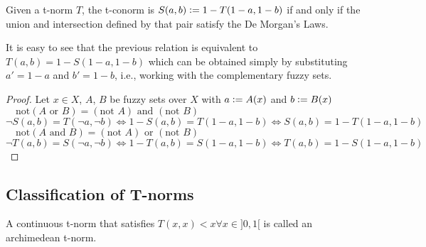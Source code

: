\begin{proposition}
  Given a t-norm $T$, the t-conorm is $S(a,b)\mathrel{\mathop:}= 1 - T(1-a, 1-b)$ if and only if the union and intersection defined by that pair satisfy the De Morgan's Laws.
\end{proposition}
\begin{remark}
  It is easy to see that the previous relation is equivalent to $T(a,b) = 1-S(1-a, 1-b)$ which can be obtained simply by substituting $a'=1-a$ and $b'=1-b$, i.e., working with the complementary fuzzy sets.
\end{remark}

\begin{proof}
  Let $x\in X$, $A$, $B$ be fuzzy sets over $X$ with $a \mathrel{\mathop:}= A(x)$ and $b \mathrel{\mathop:}= B(x)$\\

  $\quad \boxed{\text{not}(A \text{ or } B) = (\text{not } A) \text{ and } (\text{not } B)}$\\
  [0.5em]
  $\lnot S(a,b) = T(\lnot a, \lnot b) \iff 1 - S(a,b) = T(1-a, 1-b) \iff S(a,b) = 1 - T(1-a, 1-b)$\\

  $\quad \boxed{\text{not}(A \text{ and } B) = (\text{not } A) \text{ or } (\text{not } B)}$\\
  [0.5em]
  $\lnot T(a,b) = S(\lnot a, \lnot b) \iff 1 - T(a,b) = S(1-a, 1-b) \iff T(a,b) = 1 - S(1-a, 1-b)$

\end{proof}





  \subsection{Classification of T-norms}

\begin{definition}
  A continuous t-norm that satisfies $T(x,x)<x \forall x\in ]0,1[$ is called an archimedean t-norm.
\end{definition}

